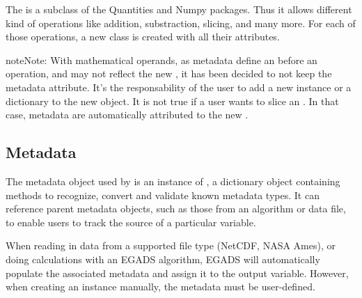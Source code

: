 \documentclass[a4paper,10pt,openany,english]{sphinxmanual}
\begin{document}
The {\hyperref[egadsapi:egads.core.egads_core.EgadsData]{}} is a subclass of the Quantities and Numpy packages. Thus it allows different kind of operations like addition, substraction, slicing, and many more. For each of those operations, a new {\hyperref[egadsapi:egads.core.egads_core.EgadsData]{}} class is created with all their attributes.

\begin{sphinxadmonition}{note}{Note:}
With mathematical operands, as metadata define an {\hyperref[egadsapi:egads.core.egads_core.EgadsData]{}} before an operation, and may not reflect the new {\hyperref[egadsapi:egads.core.egads_core.EgadsData]{}}, it has been decided to not keep the metadata attribute. It's the responsability of the user to add a new {\hyperref[egadsapi:egads.core.metadata.VariableMetadata]{}} instance or a dictionary to the new {\hyperref[egadsapi:egads.core.egads_core.EgadsData]{}} object. It is not true if a user wants to slice an {\hyperref[egadsapi:egads.core.egads_core.EgadsData]{}}. In that case, metadata are automatically attributed to the new {\hyperref[egadsapi:egads.core.egads_core.EgadsData]{}}.
\end{sphinxadmonition}


\subsection{Metadata}
\label{tutorial:metadata}
The metadata object used by {\hyperref[egadsapi:egads.core.egads_core.EgadsData]{}} is an instance of {\hyperref[egadsapi:egads.core.metadata.VariableMetadata]{}}, a dictionary object containing methods to recognize, convert and validate known metadata types. It can reference parent metadata objects, such as those from an algorithm or data file, to enable users to track the source of a particular variable.

When reading in data from a supported file type (NetCDF, NASA Ames), or doing calculations with an EGADS algorithm, EGADS will automatically populate the associated metadata and assign it to the output variable. However, when creating an {\hyperref[egadsapi:egads.core.egads_core.EgadsData]{}} instance manually, the metadata must be user-defined.
\end{document}
